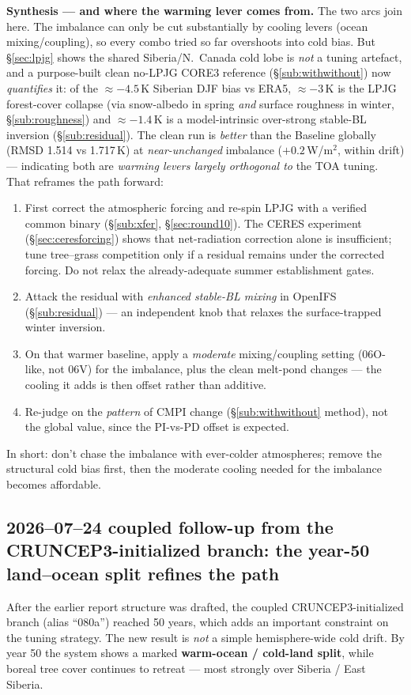\documentclass[10pt]{article}
\begin{document}
\textbf{Synthesis --- and where the warming lever comes from.} The two arcs join here. The imbalance can only be
cut substantially by cooling levers (ocean mixing/coupling), so every combo tried so far overshoots into cold
bias. But \S\ref{sec:lpjg} shows the shared Siberia/N.\ Canada cold lobe is \emph{not} a tuning artefact, and a
purpose-built clean no-LPJG CORE3 reference (\S\ref{sub:withwithout}) now \emph{quantifies} it: of the $\approx-4.5$\,K
Siberian DJF bias vs ERA5, $\approx-3$\,K is the LPJG forest-cover collapse (via snow-albedo in spring \emph{and}
surface roughness in winter, \S\ref{sub:roughness}) and $\approx-1.4$\,K is a model-intrinsic over-strong stable-BL
inversion (\S\ref{sub:residual}). The clean run is \emph{better} than the Baseline globally (RMSD 1.514 vs 1.717\,K)
at \emph{near-unchanged} imbalance ($+0.2$\,W/m$^2$, within drift) --- indicating both are \emph{warming levers
largely orthogonal to} the TOA tuning. That reframes
the path forward:
\begin{enumerate}\itemsep1pt
\item First correct the atmospheric forcing and re-spin LPJG with a verified common binary
(\S\ref{sub:xfer}, \S\ref{sec:round10}). The CERES experiment
(\S\ref{sec:ceresforcing}) shows that net-radiation correction alone is insufficient; tune tree--grass
competition only if a residual remains under the corrected forcing. Do not relax the already-adequate summer
establishment gates.
\item Attack the residual with \emph{enhanced stable-BL mixing} in OpenIFS (\S\ref{sub:residual}) --- an
independent knob that relaxes the surface-trapped winter inversion.
\item On that warmer baseline, apply a \emph{moderate} mixing/coupling setting (06O-like, not 06V) for the
imbalance, plus the clean melt-pond changes --- the cooling it adds is then offset rather than additive.
\item Re-judge on the \emph{pattern} of CMPI change (\S\ref{sub:withwithout} method), not the global value, since
the PI-vs-PD offset is expected.
\end{enumerate}
In short: don't chase the imbalance with ever-colder atmospheres; remove the structural cold bias first, then the
moderate cooling needed for the imbalance becomes affordable.

\subsection{2026--07--24 coupled follow-up from the CRUNCEP3-initialized branch: the year-50 land--ocean split refines the path}\label{sub:cruncep3_init_followup}
After the earlier report structure was drafted, the coupled
CRUNCEP3-initialized branch (alias ``080a'') reached
50 years, which adds an important constraint on the tuning strategy. The new
result is \emph{not} a simple hemisphere-wide cold drift. By year 50 the system
shows a marked \textbf{warm-ocean / cold-land split}, while boreal tree cover
continues to retreat --- most strongly over Siberia / East Siberia.
\end{document}
